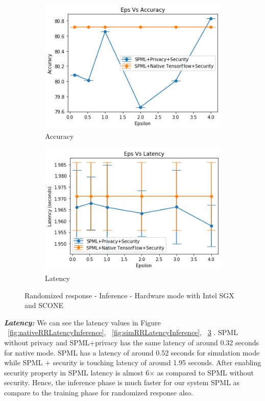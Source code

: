 \begin{figure}
     \begin{subfigure}{0.5\textwidth}
         \includegraphics[width=\textwidth]{images/Inference/RRHWAccuracy.png}
         \caption{Accuracy}
         \label{fig:hwRRAccuracyInference}
     \end{subfigure}
     \begin{subfigure}{0.5\textwidth}
         \includegraphics[width=\textwidth]{images/Inference/RRHWLatency.png}
         \caption{Latency}
         \label{fig:hwRRLatencyInference}
     \end{subfigure}
        \caption{Randomized response - Inference - Hardware mode with Intel SGX and SCONE}
\end{figure}
\newline
\newline
\textbf{\textit{Latency: }}We can see the latency values in Figure ~\ref{fig:nativeRRLatencyInference}, ~\ref{fig:simRRLatencyInference}, ~\ref{fig:hwRRLatencyInference} . SPML without privacy and SPML+privacy has the same latency of around 0.32 seconds for native mode. SPML has a latency of around 0.52 seconds for simulation mode while SPML + security is touching latency of around 1.95 seconds. After enabling security property in SPML latency is almost 6$\times$ as compared to SPML without security. Hence, the inference phase is much faster for our system SPML as compare to the training phase for randomized response also.

